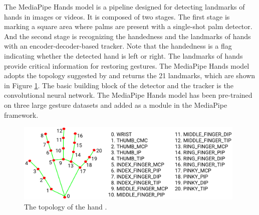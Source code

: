 \documentclass[acmsmall]{acmart}
\begin{document}
The MediaPipe Hands model is a pipeline designed for detecting landmarks of hands in images or videos. It is composed of two stages. The first stage is marking a square area where palms are present with a single-shot palm detector. And the second stage is recognizing the handedness and the landmarks of hands with an encoder-decoder-based tracker. Note that the handedness is a flag indicating whether the detected hand is left or right. The landmarks of hands provide critical information for restoring gestures. The MediaPipe Hands model adopts the topology suggested by \cite{hand} and returns the 21 landmarks, which are shown in Figure \ref{fig:hand}. The basic building block of the detector and the tracker is the convolutional neural network. The MediaPipe Hands model has been pre-trained on three large gesture datasets and added as a module in the MediaPipe framework.

\begin{figure}[!ht]
    \centering
    \includegraphics[width=11cm]{./hand.png}
    \caption{The topology of the hand \cite{google}.}
    \label{fig:hand}
\end{figure}
\end{document}
